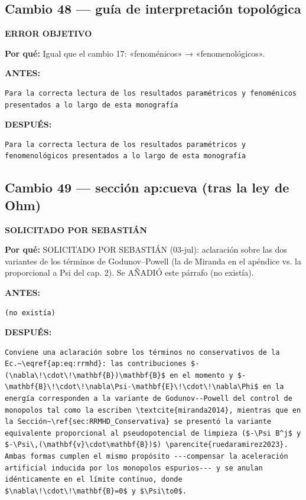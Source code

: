 \documentclass[11pt,a4paper]{article}
\begin{document}
\subsection*{Cambio 48 --- guía de interpretación topológica}
\colorbox{okbg}{\textbf{\footnotesize ERROR OBJETIVO}}

\textbf{Por qué:} Igual que el cambio 17: «fenoménicos» → «fenomenológicos».

\textcolor{antesline}{\textbf{ANTES:}}
\begin{Verbatim}[breaklines=true, breakanywhere=true, fontsize=\small, frame=leftline, rulecolor=\color{antesline}, framerule=1.2pt]
Para la correcta lectura de los resultados paramétricos y fenoménicos presentados a lo largo de esta monografía
\end{Verbatim}
\textcolor{despline}{\textbf{DESPUÉS:}}
\begin{Verbatim}[breaklines=true, breakanywhere=true, fontsize=\small, frame=leftline, rulecolor=\color{despline}, framerule=1.2pt]
Para la correcta lectura de los resultados paramétricos y fenomenológicos presentados a lo largo de esta monografía
\end{Verbatim}

\subsection*{Cambio 49 --- sección ap:cueva (tras la ley de Ohm)}
\colorbox{usrbg}{\textbf{\footnotesize SOLICITADO POR SEBASTIÁN}}

\textbf{Por qué:} SOLICITADO POR SEBASTIÁN (03-jul): aclaración sobre las dos variantes de los términos de Godunov--Powell (la de Miranda en el apéndice vs. la proporcional a Psi del cap. 2). Se AÑADIÓ este párrafo (no existía).

\textcolor{antesline}{\textbf{ANTES:}}
\begin{Verbatim}[breaklines=true, breakanywhere=true, fontsize=\small, frame=leftline, rulecolor=\color{antesline}, framerule=1.2pt]
(no existía)
\end{Verbatim}
\textcolor{despline}{\textbf{DESPUÉS:}}
\begin{Verbatim}[breaklines=true, breakanywhere=true, fontsize=\small, frame=leftline, rulecolor=\color{despline}, framerule=1.2pt]
Conviene una aclaración sobre los términos no conservativos de la Ec.~\eqref{ap:eq:rrmhd}: las contribuciones $-(\nabla\!\cdot\!\mathbf{B})\mathbf{B}$ en el momento y $-\mathbf{B}\!\cdot\!\nabla\Psi-\mathbf{E}\!\cdot\!\nabla\Phi$ en la energía corresponden a la variante de Godunov--Powell del control de monopolos tal como la escriben \textcite{miranda2014}, mientras que en la Sección~\ref{sec:RRMHD_Conservativa} se presentó la variante equivalente proporcional al pseudopotencial de limpieza ($-\Psi B^j$ y $-\Psi\,(\mathbf{v}\cdot\mathbf{B})$) \parencite{ruedaramirez2023}. Ambas formas cumplen el mismo propósito ---compensar la aceleración artificial inducida por los monopolos espurios--- y se anulan idénticamente en el límite continuo, donde $\nabla\!\cdot\!\mathbf{B}=0$ y $\Psi\to0$.
\end{Verbatim}
\end{document}
